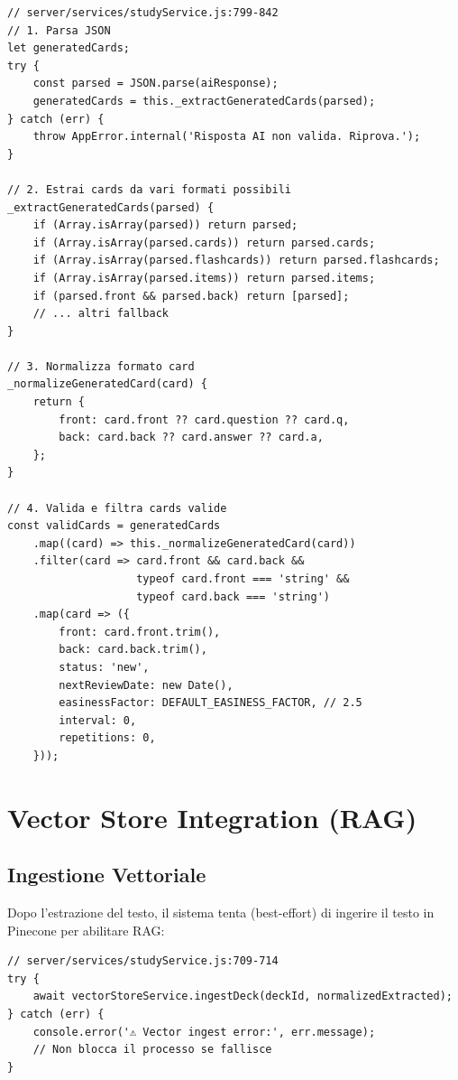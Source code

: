 \documentclass[11pt,a4paper]{article}
\begin{document}
\begin{lstlisting}[caption=Parsing Risposta OpenAI]
// server/services/studyService.js:799-842
// 1. Parsa JSON
let generatedCards;
try {
    const parsed = JSON.parse(aiResponse);
    generatedCards = this._extractGeneratedCards(parsed);
} catch (err) {
    throw AppError.internal('Risposta AI non valida. Riprova.');
}

// 2. Estrai cards da vari formati possibili
_extractGeneratedCards(parsed) {
    if (Array.isArray(parsed)) return parsed;
    if (Array.isArray(parsed.cards)) return parsed.cards;
    if (Array.isArray(parsed.flashcards)) return parsed.flashcards;
    if (Array.isArray(parsed.items)) return parsed.items;
    if (parsed.front && parsed.back) return [parsed];
    // ... altri fallback
}

// 3. Normalizza formato card
_normalizeGeneratedCard(card) {
    return {
        front: card.front ?? card.question ?? card.q,
        back: card.back ?? card.answer ?? card.a,
    };
}

// 4. Valida e filtra cards valide
const validCards = generatedCards
    .map((card) => this._normalizeGeneratedCard(card))
    .filter(card => card.front && card.back && 
                    typeof card.front === 'string' && 
                    typeof card.back === 'string')
    .map(card => ({
        front: card.front.trim(),
        back: card.back.trim(),
        status: 'new',
        nextReviewDate: new Date(),
        easinessFactor: DEFAULT_EASINESS_FACTOR, // 2.5
        interval: 0,
        repetitions: 0,
    }));
\end{lstlisting}

\section{Vector Store Integration (RAG)}

\subsection{Ingestione Vettoriale}

Dopo l'estrazione del testo, il sistema tenta (best-effort) di ingerire il testo in Pinecone per abilitare RAG:

\begin{lstlisting}[caption=Ingestione Vettoriale]
// server/services/studyService.js:709-714
try {
    await vectorStoreService.ingestDeck(deckId, normalizedExtracted);
} catch (err) {
    console.error('⚠️ Vector ingest error:', err.message);
    // Non blocca il processo se fallisce
}
\end{lstlisting}
\end{document}
